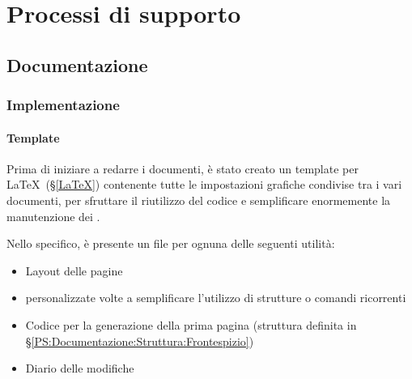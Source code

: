 
\section{Processi di supporto}\label{PS}

	\subsection{Documentazione}\label{PS:Documentazione}


		\subsubsection{Implementazione}\label{PS:Documentazione:Implementazione}

			\paragraph{Template}\label{PS:Documentazione:Implementazione:Template}
			Prima di iniziare a redarre i documenti, è stato creato un template per \LaTeX \ (\S\ref{LaTeX})
			contenente tutte le impostazioni grafiche condivise tra i vari documenti, per sfruttare il riutilizzo
			del codice e semplificare enormemente la manutenzione dei .\par
			Nello specifico, è presente un file per ognuna delle seguenti utilità:
			\begin{itemize}
				\item Layout delle pagine
				\item {} personalizzate volte a semplificare l'utilizzo di strutture o comandi ricorrenti
				\item Codice per la generazione della prima pagina
					(struttura definita in \S\ref{PS:Documentazione:Struttura:Frontespizio})
				\item Diario delle modifiche
			\end{itemize}

